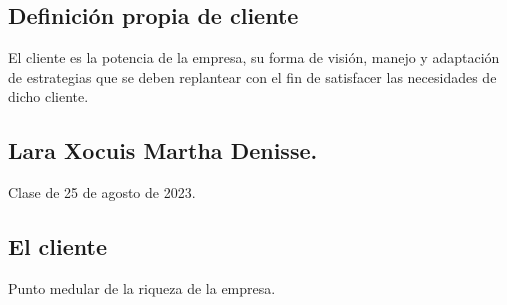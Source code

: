 \documentclass[letterpaper,12pt]{article}
\begin{document}
\begin{sloppypar}
\subsection*{Definición propia de cliente}
El cliente es la potencia de la empresa, su forma de visión, manejo y adaptación de estrategias que se deben replantear con el fin de satisfacer las necesidades de dicho cliente.

\newpage
\subsection*{Lara Xocuis Martha Denisse.}
Clase de 25 de agosto de 2023.
\textcolor[rgb]{0.5,0.5,0.3}{\section{El cliente}}
Punto medular de la riqueza de la empresa. 


\end{sloppypar}
\end{document}

